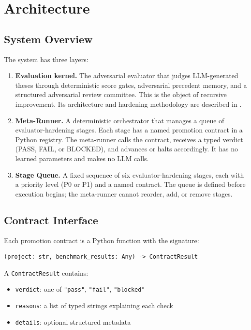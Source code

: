 \documentclass[11pt]{article}
\begin{document}
\section{Architecture}

\subsection{System Overview}

The system has three layers:

\begin{enumerate}[nosep]
\item \textbf{Evaluation kernel.} The adversarial evaluator that judges LLM-generated theses through deterministic score gates, adversarial precedent memory, and a structured adversarial review committee. This is the object of recursive improvement. Its architecture and hardening methodology are described in \citet{alami2025a, alami2025b}.

\item \textbf{Meta-Runner.} A deterministic orchestrator that manages a queue of evaluator-hardening stages. Each stage has a named promotion contract in a Python registry. The meta-runner calls the contract, receives a typed verdict (PASS, FAIL, or BLOCKED), and advances or halts accordingly. It has no learned parameters and makes no LLM calls.

\item \textbf{Stage Queue.} A fixed sequence of six evaluator-hardening stages, each with a priority level (P0 or P1) and a named contract. The queue is defined before execution begins; the meta-runner cannot reorder, add, or remove stages.
\end{enumerate}

\subsection{Contract Interface}

Each promotion contract is a Python function with the signature:

\begin{lstlisting}
(project: str, benchmark_results: Any) -> ContractResult
\end{lstlisting}

A \texttt{ContractResult} contains:
\begin{itemize}[nosep]
\item \texttt{verdict}: one of \texttt{"pass"}, \texttt{"fail"}, \texttt{"blocked"}
\item \texttt{reasons}: a list of typed strings explaining each check
\item \texttt{details}: optional structured metadata
\end{itemize}
\end{document}
